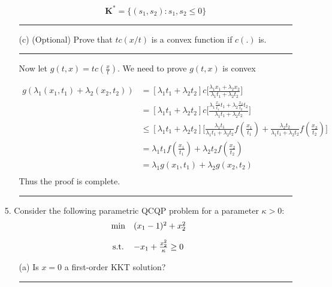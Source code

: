 \documentclass{article} %
\newcommand{\B}[1]{\mathbf#1}
\begin{document}
\begin{enumerate}
\begin{enumerate}
\[
\B{K}^{*} = \{(s_1, s_2): s_1,s_2 \leq  0 \}
\]


\rule{\textwidth}{1pt}


\item[(c)] (Optional) Prove that $tc(x/t)$ is a convex function if $c(.)$ is.


\rule{\textwidth}{1pt}

Now let $g(t,x) = t c(\frac{x}{t})$. We need to prove $g(t,x)$ is convex 

\begin{equation*}
\begin{aligned}
g( \lambda_1 (x_1, t_1) + \lambda_2 (x_2, t_2)) &= [\lambda_1 t_1 + \lambda_2 t_2] c\big[ \frac{ \lambda_1 x_1 + \lambda_2 x_2}{\lambda_1 t_1 + \lambda_2 t_2 } \big]\\
&=  [\lambda_1 t_1 + \lambda_2 t_2] c\big[ \frac{ \lambda_1 \frac{x_1}{t_1} t_1 + \lambda_2 \frac{x_2}{t_2}t_2} {\lambda_1 t_1 + \lambda_2 t_2 }\big]\\ 
&\leq [\lambda_1 t_1 + \lambda_2 t_2] \bigg[ \frac{\lambda_1 t_1 }{\lambda_1 t_1 + \lambda_2 t_2} f(\frac{x_1}{t_1}) + \frac{\lambda_2 t_2 }{\lambda_1 t_1 + \lambda_2 t_2} f(\frac{x_2}{t_2}) \bigg] \\ 
&= \lambda_1 t_1 f(\frac{x_1}{t_1}) + \lambda_2 t_2 f(\frac{x_2}{t_2}) \\ 
&= \lambda_1 g(x_1, t_1) + \lambda_2 g(x_2, t_2) \\ 
\end{aligned}
\end{equation*}
Thus the proof is complete. 


\rule{\textwidth}{1pt}


\end{enumerate}

\item[5.] Consider the following parametric QCQP problem for a parameter $\kappa>0$:
\begin{equation}\label{eq:qp}
 \begin{array}{c@{\quad}l}
   \min   & (x_1-1)^2+x_2^2 \\ [10pt]
   \mbox{s.t.} & -x_{1} + \frac{x^2_{2}}{\kappa}  \geq 0 
   \end{array}
\end{equation}
\begin{itemize}


\item[(a)] Is $x=0$ a first-order KKT solution?
 
 \rule{\textwidth}{1pt}


\end{itemize}
\end{enumerate}
\end{document}
